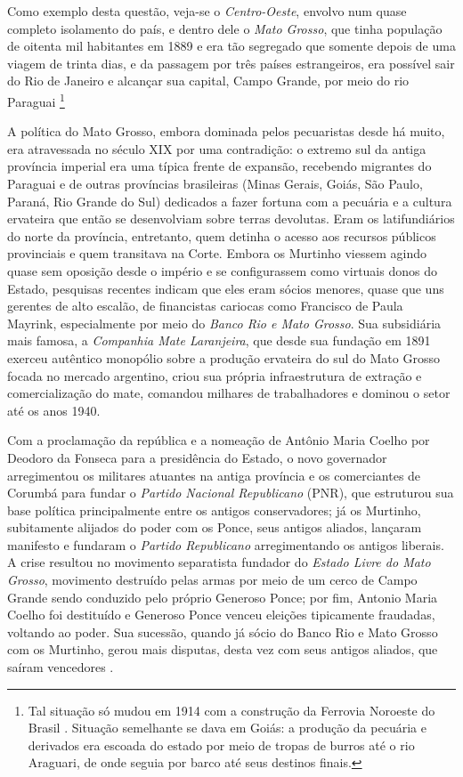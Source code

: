 Como exemplo desta questão, veja-se o \textit{Centro-Oeste}, envolvo num quase completo isolamento do país, e dentro dele o \textit{Mato Grosso}, que tinha população de oitenta mil habitantes em 1889 e era tão segregado que somente depois de uma viagem de trinta dias, e da passagem por três países estrangeiros, era possível sair do Rio de Janeiro e alcançar sua capital, Campo Grande, por meio do rio Paraguai \cite{almeida_matogrosso_2011}\footnote{Tal situação só mudou em 1914 com a construção da Ferrovia Noroeste do Brasil \cite{almeida_matogrosso_2011}. Situação semelhante se dava em Goiás: a produção da pecuária e derivados era escoada do estado por meio de tropas de burros até o rio Araguari, de onde seguia por barco até seus destinos finais.}

A política do Mato Grosso, embora dominada pelos pecuaristas desde há muito, era atravessada no século XIX por uma contradição: o extremo sul da antiga província imperial era uma típica frente de expansão, recebendo migrantes do Paraguai e de outras províncias brasileiras (Minas Gerais, Goiás, São Paulo, Paraná, Rio Grande do Sul) dedicados a fazer fortuna com a pecuária e a cultura ervateira que então se desenvolviam sobre terras devolutas. Eram os latifundiários do norte da província, entretanto, quem detinha o acesso aos recursos públicos provinciais e quem transitava na Corte. Embora os Murtinho viessem agindo quase sem oposição desde o império e se configurassem como virtuais donos do Estado, pesquisas recentes \cite{queiroz_murtinho_2010} indicam que eles eram sócios menores, quase que uns gerentes de alto escalão, de financistas cariocas como Francisco de Paula Mayrink, especialmente por meio do \textit{Banco Rio e Mato Grosso}. Sua subsidiária mais famosa, a \textit{Companhia Mate Laranjeira}, que desde sua fundação em 1891 exerceu autêntico monopólio sobre a produção ervateira do sul do Mato Grosso focada no mercado argentino, criou sua própria infraestrutura de extração e comercialização do mate, comandou milhares de trabalhadores e dominou o setor até os anos 1940.

Com a proclamação da república e a nomeação de Antônio Maria Coelho por Deodoro da Fonseca para a presidência do Estado, o novo governador arregimentou os militares atuantes na antiga província e os comerciantes de Corumbá para fundar o \textit{Partido Nacional Republicano} (PNR), que estruturou sua base política principalmente entre os antigos conservadores; já os Murtinho, subitamente alijados do poder com os Ponce, seus antigos aliados, lançaram manifesto e fundaram o \textit{Partido Republicano} arregimentando os antigos liberais. A crise resultou no movimento separatista fundador do \textit{Estado Livre do Mato Grosso}, movimento destruído pelas armas por meio de um cerco de Campo Grande sendo conduzido pelo próprio Generoso Ponce; por fim, Antonio Maria Coelho foi destituído e Generoso Ponce venceu eleições tipicamente fraudadas, voltando ao poder. Sua sucessão, quando já sócio do Banco Rio e Mato Grosso com os Murtinho, gerou mais disputas, desta vez com seus antigos aliados, que saíram vencedores \cite{almeida_matogrosso_2011}. 

